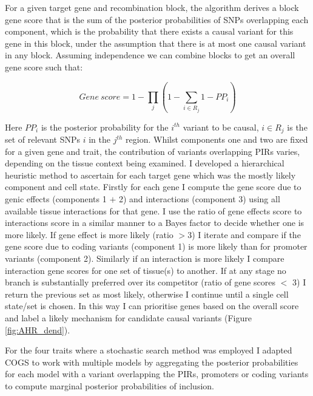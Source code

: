 \documentclass[a4paper,11pt]{report}
\begin{document}
For a given target gene and recombination block, the algorithm derives a block gene score that is the sum of the posterior probabilities of SNPs overlapping each component, which is the probability that there exists a causal variant for this gene in this block, under the assumption that there is at most one causal variant in any block. Assuming independence we can combine blocks to get an overall gene score such that:

\begin{equation}
  Gene\ score = 1- \prod_j  \left(1-\sum_{i \in R_j} 1-PP_i  \right)
  \label{eqn:cogs_score}
\end{equation}

Here $PP_i$ is the posterior probability for the $i^{th}$ variant to be causal, $i \in R_j$ is the set of relevant SNPs $i$ in the $j^{th}$ region. Whilst components one and two are fixed for a given gene and trait, the contribution of variants overlapping PIRs varies, depending on the tissue context being examined. I developed a hierarchical heuristic method to ascertain for each target gene which was the mostly likely component and cell state. Firstly for each gene I compute the gene score due to genic effects (components 1 $+$ 2) and interactions (component 3) using all available tissue interactions for that gene. I use the ratio of gene effects score to interactions score in a similar manner to a Bayes factor to decide whether one is more likely. If gene effect is more likely (ratio $>$3) I iterate and compare if the gene score due to coding variants (component 1) is more likely than for promoter variants (component 2). Similarly if an interaction is more likely I compare interaction gene scores for one set of tissue(s) to another. If at any stage no branch is substantially preferred over its competitor (ratio of gene scores $<$ 3) I return the previous set as most likely, otherwise I continue until a single cell state/set is chosen. In this way I can prioritise genes based on the overall score and label a likely mechanism for candidate causal variants (Figure \ref{fig:AHR_dend}).

For the four traits where a stochastic search method was employed I adapted COGS to work with multiple models by aggregating the  posterior probabilities for each model with a variant overlapping the PIRs, promoters or coding variants to compute marginal posterior probabilities of inclusion.
\end{document}
